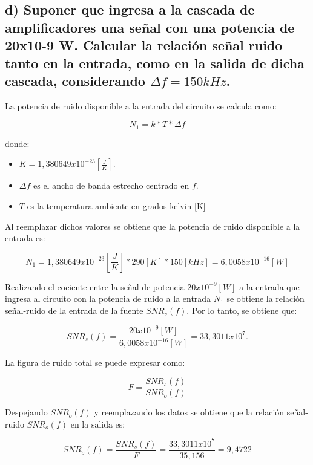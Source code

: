 	
	
	

\subsection*{d) Suponer que ingresa a la cascada de amplificadores una señal con una potencia de 20x10-9 W. Calcular la relación señal ruido 
	tanto en la entrada, como en la salida de dicha cascada, considerando $\Delta f = 150 kHz$.}
	
	
	La potencia de ruido disponible a la entrada del circuito se calcula como:
	
	\[
		N_1 = k*T*\Delta f
	\]
	
	donde:
	
	\begin{itemize}
		\item $K = 1,380649x10^{-23} [\frac{J}{K}]$.
		\item $\Delta f$ es el ancho de banda estrecho centrado en $f$.
		\item $T$ es la temperatura ambiente en grados kelvin [K] 
	\end{itemize}
	
	Al reemplazar dichos valores se obtiene que la potencia de ruido disponible a la entrada es:
	
	\[
		N_1 =1,380649x10^{-23} [\frac{J}{K}]*290 [K]*150 [kHz] = 6,0058x10^{-16} [W]
	\]

	Realizando el cociente entre la señal de potencia $20x10^{-9} [W]$ a la entrada que ingresa al circuito con la potencia de ruido a la entrada $N_1$ se obtiene la relación 
	señal-ruido de la entrada de la fuente $SNR_s (f)$. Por lo tanto, se obtiene que:
	
	\[
		SNR_s (f) = \frac{20x10^{-9} [W]}{6,0058x10^{-16} [W]} = 33,3011x10^7.
	\]
	
	La figura de ruido total se puede expresar como:
	
	\[
		F = \frac{SNR_s (f)}{SNR_o (f)}
	\]
	
	Despejando $SNR_o (f)$ y reemplazando los datos se obtiene que la relación señal-ruido $SNR_o (f)$ en la salida es:
		
	\[
		SNR_o (f) = \frac{SNR_s (f)}{F} = \frac{33,3011x10^7}{35,156} = 9,4722
	\]
	
	
	